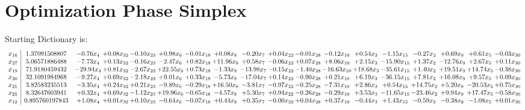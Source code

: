 \documentclass[9pt]{article}
\begin{document}
\section{Optimization Phase Simplex}
Starting Dictionary is:
\[\begin{array}{c| c c@{\hskip 2pt} c@{\hskip 2pt} c@{\hskip 2pt} c@{\hskip 2pt} c@{\hskip 2pt} c@{\hskip 2pt} c@{\hskip 2pt} c@{\hskip 2pt} c@{\hskip 2pt} c@{\hskip 2pt} c@{\hskip 2pt} c@{\hskip 2pt} c@{\hskip 2pt} c@{\hskip 2pt} c@{\hskip 2pt} c@{\hskip 2pt} }
 x_{16}   &  1.37091508807 & -0.76 x_{4} & +  0.08 x_{32} & -0.10 x_{23} & +  0.98 x_{6} & -0.01 x_{18} & +  0.08 x_{8} & -0.20 x_{7} & +  0.04 x_{22} & -0.01 x_{28} & -0.12 x_{10} & +  0.54 x_{3} & -1.15 x_{15} & -0.27 x_{2} & +  0.69 x_{9} & +  0.61 x_{5} & -0.03 x_{30}\\
 x_{27}   &  5.06571886488 & -7.73 x_{4} & +  0.13 x_{32} & -0.16 x_{23} & -2.47 x_{6} & +  0.82 x_{18} & + 11.96 x_{8} & +  0.58 x_{7} & -0.06 x_{22} & +  0.07 x_{28} & +  8.06 x_{10} & +  2.15 x_{3} & -15.90 x_{15} & +  1.37 x_{2} & -12.76 x_{9} & +  2.67 x_{5} & +  0.11 x_{30}\\
 x_{19}   &  71.9180459432 & -29.94 x_{4} & +  0.81 x_{32} & -2.67 x_{23} & + 22.55 x_{6} & +  0.73 x_{18} & -1.33 x_{8} & -13.98 x_{7} & -0.15 x_{22} & -1.40 x_{28} & -16.63 x_{10} & + 18.68 x_{3} & -35.61 x_{15} & +  1.40 x_{2} & + 19.51 x_{9} & + 14.74 x_{5} & -0.38 x_{30}\\
 x_{20}   &  32.1091984968 & -9.27 x_{4} & +  0.69 x_{32} & -2.18 x_{23} & +  9.01 x_{6} & +  0.33 x_{18} & -5.73 x_{8} & -17.04 x_{7} & +  0.14 x_{22} & -0.90 x_{28} & +  0.21 x_{10} & +  6.19 x_{3} & -36.15 x_{15} & +  7.81 x_{2} & + 16.08 x_{9} & +  9.57 x_{5} & +  0.09 x_{30}\\
 x_{21}   &  3.82583235513 & -3.35 x_{4} & +  0.24 x_{32} & +  0.21 x_{23} & -9.89 x_{6} & -0.29 x_{18} & + 16.50 x_{8} & -3.81 x_{7} & -0.97 x_{22} & -0.25 x_{28} & -7.31 x_{10} & +  2.86 x_{3} & +  0.54 x_{15} & + 14.75 x_{2} & +  5.20 x_{9} & -20.53 x_{5} & +  0.75 x_{30}\\
 x_{25}   &  8.32647603941 & +  0.32 x_{4} & +  0.69 x_{32} & -1.12 x_{23} & + 19.96 x_{6} & -0.65 x_{18} & -4.57 x_{8} & +  5.30 x_{7} & +  0.94 x_{22} & -0.26 x_{28} & -0.29 x_{10} & +  3.53 x_{3} & -11.65 x_{15} & -23.46 x_{2} & +  9.94 x_{9} & + 17.47 x_{5} & -0.58 x_{30}\\
 x_{12}   &  0.895760197843 & +  1.08 x_{4} & +  0.01 x_{32} & +  0.10 x_{23} & -0.64 x_{6} & -0.07 x_{18} & +  0.44 x_{8} & +  0.35 x_{7} & -0.00 x_{22} & +  0.04 x_{28} & +  0.37 x_{10} & -0.44 x_{3} & +  1.43 x_{15} & -0.59 x_{2} & -0.38 x_{9} & -1.08 x_{5} & +  0.01 x_{30}\\

\end{array}\]
\end{document}
